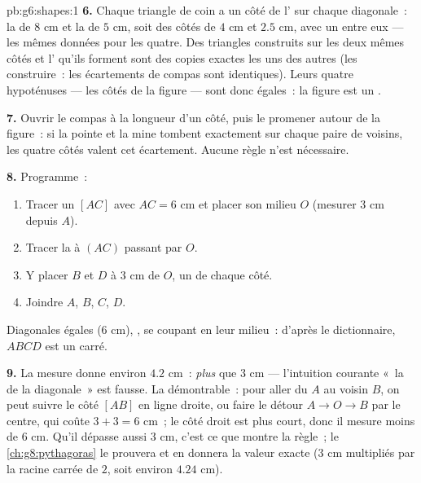 \begin{solution}{pb:g6:shapes:1}
\textbf{6.} Chaque triangle de coin a un côté de l' sur
chaque diagonale~: la  de $8$ cm et la  de $5$ cm, soit
des côtés de $4$ cm et $2.5$ cm, avec un  entre eux ---
les mêmes données pour les quatre. Des triangles construits sur les
deux mêmes côtés et l' qu'ils forment sont des copies
exactes les uns des autres (les construire~: les écartements de
compas sont identiques). Leurs quatre hypoténuses --- les côtés de
la figure --- sont donc égales~: la figure est un .

\textbf{7.} Ouvrir le compas à la longueur d'un côté, puis le
promener autour de la figure~: si la pointe et la mine tombent
exactement sur chaque paire de  voisins, les quatre côtés
valent cet écartement. Aucune règle n'est nécessaire.

\textbf{8.} Programme~:
\begin{enumerate}
  \item Tracer un  $[AC]$ avec $AC = 6$ cm et placer son
        milieu $O$ (mesurer $3$ cm depuis $A$).
  \item Tracer la  à $(AC)$ passant par $O$.
  \item Y placer $B$ et $D$ à $3$ cm de $O$, un de chaque côté.
  \item Joindre $A$, $B$, $C$, $D$.
\end{enumerate}
Diagonales égales ($6$ cm), , se coupant en leur
milieu~: d'après le dictionnaire, $ABCD$ est un carré.

\textbf{9.} La mesure donne environ $4.2$ cm~: \emph{plus} que
$3$ cm --- l'intuition courante «~la  de la diagonale~» est
fausse. La  démontrable~: pour aller du  $A$ au 
voisin $B$, on peut suivre le côté $[AB]$ en ligne droite, ou faire
le détour $A \to O \to B$ par le centre, qui coûte
$3 + 3 = 6$ cm~; le côté droit est plus court, donc il mesure moins
de $6$ cm. Qu'il dépasse aussi $3$ cm, c'est ce que montre la
règle~; le \cref{ch:g8:pythagoras} le prouvera et en donnera la
valeur exacte ($3$ cm multipliés par la racine carrée de $2$, soit
environ $4.24$ cm).


\end{solution}
